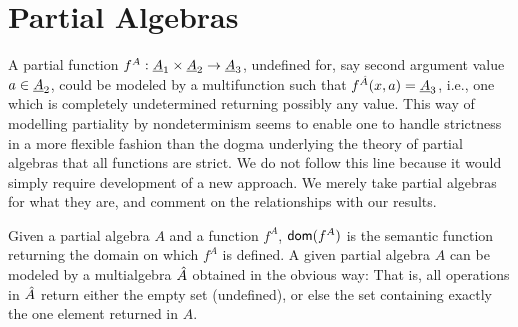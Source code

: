 \documentclass[10pt]{article}
\begin{document}
\section{Partial Algebras}
\label{se:pa}

A partial function $f^A:\underline {A}_1\times\underline {A}_2\rightarrow \underline {A}_3$, undefined for,
say second argument value $a\in \underline {A}_2$, could be modeled by a multifunction
such that $f^{\hat{A}}(x,a)=\underline {A}_3$, i.e., one which is completely undetermined 
returning possibly
any value. This way of modelling partiality by nondeterminism seems to
enable one to handle strictness in a more flexible fashion than the
dogma underlying the theory of partial algebras that all
functions are strict. 
We do
not follow this line because it would simply require development of a
new approach.  We merely take partial algebras for what they are, and
comment on the relationships with our results. 

Given a partial algebra $A$ and a function $f^A$, $\mbox{\sf dom}(f^A)$ is the semantic 
function returning the domain on which $f^A$ is defined.
A given partial algebra $A$ can be modeled by a multialgebra $\hat{A}$ 
obtained in the obvious way:
That is, all operations in $\hat{A}$ return either the empty set (undefined),
 or else the set containing exactly the one element returned in $A$.
\end{document}
